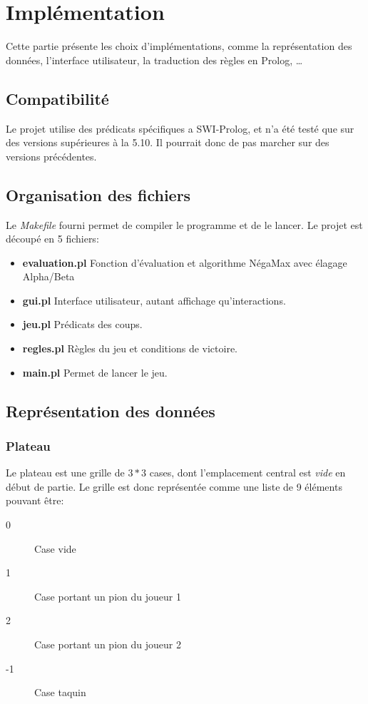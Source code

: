 \documentclass[a4paper,12pt]{article}
\begin{document}
\section{Implémentation}
Cette partie présente les choix d'implémentations, comme la représentation des données, l'interface utilisateur,
la traduction des règles en Prolog, \dots

\subsection{Compatibilité}
Le projet utilise des prédicats spécifiques a SWI-Prolog, et n'a été testé que sur des versions supérieures à la 5.10. Il pourrait donc de pas marcher sur des versions précédentes.

\subsection{Organisation des fichiers}
Le \emph{Makefile} fourni permet de compiler le programme et de le lancer. Le projet est découpé en 5 fichiers:
  \begin{itemize}
    \item \textbf{evaluation.pl} Fonction d'évaluation et algorithme NégaMax avec élagage Alpha/Beta
    \item \textbf{gui.pl} Interface utilisateur, autant affichage qu'interactions.
    \item \textbf{jeu.pl} Prédicats des coups.
    \item \textbf{regles.pl} Règles du jeu et conditions de victoire.
    \item \textbf{main.pl} Permet de lancer le jeu.
  \end{itemize}

\subsection{Représentation des données}
\subsubsection{Plateau}
Le plateau est une grille de $3 * 3$ cases, dont l'emplacement central est \emph{vide} en début de partie.
Le grille est donc représentée comme une liste de 9 éléments pouvant être:
  \begin{description}
    \item[0]  Case vide
    \item[1]  Case portant un pion du joueur 1
    \item[2]  Case portant un pion du joueur 2
    \item[-1] Case taquin
  \end{description}
  
\end{document}
